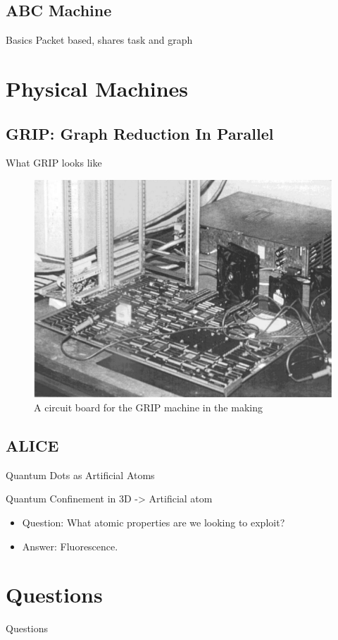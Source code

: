 \documentclass{beamer}
\begin{document}
\subsection[The ABC Machines]{ABC Machine}
\begin{frame}{Basics}
Packet based, shares task and graph
\end{frame}

\section{Physical Machines}

\subsection[GRIP]{GRIP: Graph Reduction In Parallel}
\begin{frame}[fragile]{What GRIP looks like}{}

\begin{figure}[h]
 \centering
 \includegraphics[scale=.4]{figures/GRIP.png}
 \caption{A circuit board for the GRIP machine in the making \cite{PFPAnIntro}}
\end{figure}
\end{frame}

\subsection[ALICE]{ALICE}

\begin{frame}{Quantum Dots as Artificial Atoms}{}

  Quantum Confinement in 3D -> Artificial atom
  \begin{itemize}
  \item
   Question: What atomic properties are we looking to exploit?
   \pause
  \item
    Answer: Fluorescence.
  \end{itemize}
\end{frame}


\section*{Questions}

\begin{frame}
\centering
Questions
\end{frame}
\begin{frame}


\end{frame}
\end{document}
